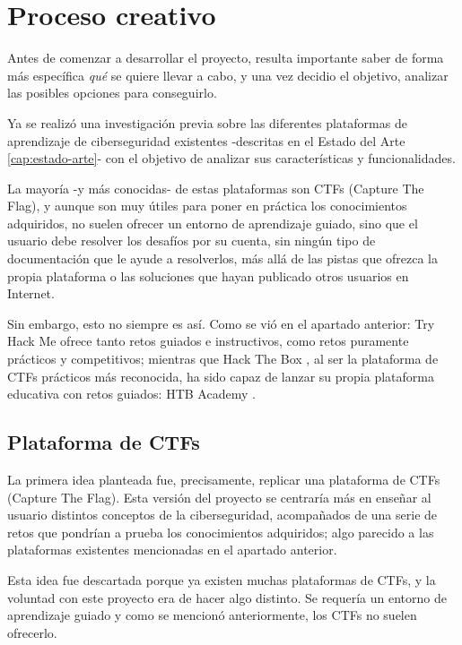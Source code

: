     \section{Proceso creativo}
        \label{sec:proceso-creativo}

        Antes de comenzar a desarrollar el proyecto, resulta importante saber de forma más específica \textit{qué} se quiere llevar a cabo, y una vez decidio el objetivo, analizar las posibles opciones para conseguirlo.
        
        Ya se realizó una investigación previa sobre las diferentes plataformas de aprendizaje de ciberseguridad existentes -descritas en el Estado del Arte \ref{cap:estado-arte}- con el objetivo de analizar sus características y funcionalidades.
        
        La mayoría -y más conocidas- de estas plataformas son CTFs (Capture The Flag), y aunque son muy útiles para poner en práctica los conocimientos adquiridos, no suelen ofrecer un entorno de aprendizaje guiado, sino que el usuario debe resolver los desafíos por su cuenta, sin ningún tipo de documentación que le ayude a resolverlos, más allá de las pistas que ofrezca la propia plataforma o las soluciones que hayan publicado otros usuarios en Internet.

        Sin embargo, esto no siempre es así. Como se vió en el apartado anterior: Try Hack Me \cite{tryhackme} ofrece tanto retos guiados e instructivos, como retos puramente prácticos y competitivos; mientras que Hack The Box \cite{hackthebox}, al ser la plataforma de CTFs prácticos más reconocida, ha sido capaz de lanzar su propia plataforma educativa con retos guiados: HTB Academy \cite{hackthebox-academy}. 

        \subsection{Plataforma de CTFs}

            La primera idea planteada fue, precisamente, replicar una plataforma de CTFs (Capture The Flag). Esta versión del proyecto se centraría más en enseñar al usuario distintos conceptos de la ciberseguridad, acompañados de una serie de retos que pondrían a prueba los conocimientos adquiridos; algo parecido a las plataformas existentes mencionadas en el apartado anterior.

            Esta idea fue descartada porque ya existen muchas plataformas de CTFs, y la voluntad con este proyecto era de hacer algo distinto. Se requería un entorno de aprendizaje guiado y como se mencionó anteriormente, los CTFs no suelen ofrecerlo.

